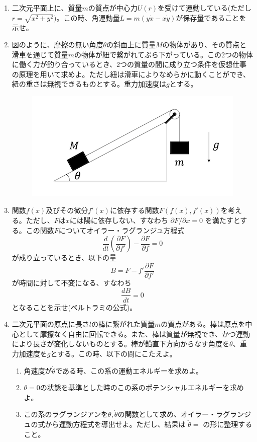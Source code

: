 \documentclass{jsarticle}
\begin{document}
\begin{enumerate}
    \item 二次元平面上に、質量$m$の質点が中心力$U(r)$を受けて運動している(ただし$r=\sqrt{x^2+y^2})$。この時、角運動量$L=m(y\dot{x} - x\dot{y})$が保存量であることを示せ。
    \item 図のように、摩擦の無い角度$\theta$の斜面上に質量$M$の物体があり、その質点と滑車を通じて質量$m$の物体が紐で繋がれてぶら下がっている。この2つの物体に働く力が釣り合っているとき、2つの質量の間に成り立つ条件を仮想仕事の原理を用いて求めよ。ただし紐は滑車によりなめらかに動くことができ、紐の重さは無視できるものとする。重力加速度は$g$とする。
          \begin{figure}[H]
              \centering
              \includegraphics{fig/slope.png}
          \end{figure}
    \item 関数$f(x)$及びその微分$f'(x)$に依存する関数$F(f(x), f'(x))$を考える。ただし、$F$は$x$には陽に依存しない、すなわち $\partial F/\partial x = 0$ を満たすとする。この関数$F$についてオイラー・ラグランジュ方程式
          $$
              \frac{d}{dt} \left(\frac{\partial F}{\partial f'} \right)
              - \frac{\partial F}{\partial f} = 0
          $$
          が成り立っているとき、以下の量
          $$
              B = F - f' \frac{\partial F}{\partial f'}
          $$
          が時間に対して不変になる、すなわち
          $$
              \frac{dB}{dt} = 0
          $$
          となることを示せ(ベルトラミの公式)。

          \newpage

    \item 二次元平面の原点に長さ$l$の棒に繋がれた質量$m$の質点がある。棒は原点を中心として摩擦なく自由に回転できる。また、棒は質量が無視でき、かつ運動により長さが変化しないものとする。棒が鉛直下方向からなす角度を$\theta$、重力加速度を$g$とする。この時、以下の問にこたえよ。
          \begin{enumerate}

              \item 角速度が$\dot{\theta}$である時、この系の運動エネルギーを求めよ。
              \item $\theta=0$の状態を基準とした時のこの系のポテンシャルエネルギーを求めよ。
              \item この系のラグランジアンを$\theta, \dot{\theta}$の関数として求め、オイラー・ラグランジュの式から運動方程式を導出せよ。ただし、結果は $\ddot{\theta} = $ の形に整理すること。
          \end{enumerate}


\end{enumerate}
\end{document}

